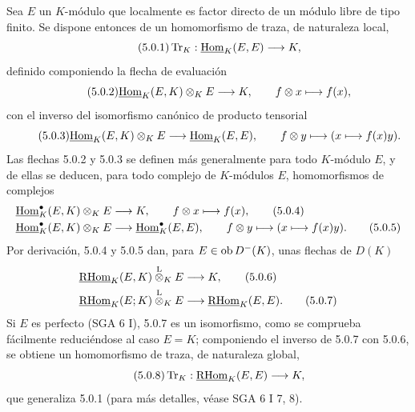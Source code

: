 Sea $E$ un $K$-módulo que localmente es factor directo de un módulo libre de tipo finito. Se dispone entonces de un homomorfismo de traza, de naturaleza local,
\begin{equation}\tag{5.0.1}
\operatorname{Tr}_K:\underline{\operatorname{Hom}}_K(E,E)\longrightarrow K,
\end{equation}
definido componiendo la flecha de evaluación
\begin{equation}\tag{5.0.2}
\underline{\operatorname{Hom}}_K(E,K)\otimes_KE\longrightarrow K,\qquad f\otimes x\longmapsto f(x),
\end{equation}
con el inverso del isomorfismo canónico de producto tensorial
\begin{equation}\tag{5.0.3}
\underline{\operatorname{Hom}}_K(E,K)\otimes_KE\longrightarrow\underline{\operatorname{Hom}}_K(E,E),\qquad f\otimes y\longmapsto (x\longmapsto f(x)y).
\end{equation}
Las flechas 5.0.2 y 5.0.3 se definen más generalmente para todo $K$-módulo $E$, y de ellas se deducen, para todo complejo de $K$-módulos $E$, homomorfismos de complejos
\begin{align}
\underline{\operatorname{Hom}}_K^\bullet(E,K)\otimes_KE&\longrightarrow K,\qquad f\otimes x\longmapsto f(x),\tag{5.0.4}\\
\underline{\operatorname{Hom}}_K^\bullet(E,K)\otimes_KE&\longrightarrow \underline{\operatorname{Hom}}_K^\bullet(E,E),\qquad f\otimes y\longmapsto (x\longmapsto f(x)y).\tag{5.0.5}
\end{align}
Por derivación, 5.0.4 y 5.0.5 dan, para $E\in\operatorname{ob} D^-(K)$, unas flechas de $D(K)$
\begin{align}
\underline{\mathrm{RHom}}_K(E,K)\overset{\mathrm L}{\otimes}_KE&\longrightarrow K,\tag{5.0.6}\\
\underline{\mathrm{RHom}}_K(E;K)\overset{\mathrm L}{\otimes}_KE&\longrightarrow\underline{\mathrm{RHom}}_K(E,E).\tag{5.0.7}
\end{align}
Si $E$ es perfecto (SGA 6 I), 5.0.7 es un isomorfismo, como se comprueba fácilmente reduciéndose al caso $E=K$; componiendo el inverso de 5.0.7 con 5.0.6, se obtiene un homomorfismo de traza, de naturaleza global,
\begin{equation}\tag{5.0.8}
\operatorname{Tr}_K:\underline{\mathrm{RHom}}_K(E,E)\longrightarrow K,
\end{equation}
que generaliza 5.0.1 (para más detalles, véase SGA 6 I 7, 8).
